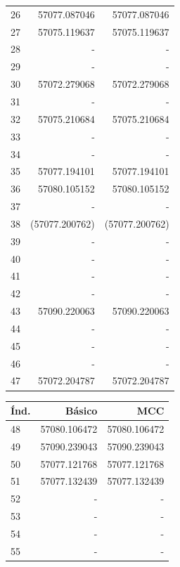 \begin{appendix}
\begin{table}[h!]
\begin{tabular}{|l|r|r|}
26& 57077.087046   & 57077.087046   \\
27& 57075.119637   & 57075.119637   \\
28& -              & -              \\
29& -              & -              \\
30& 57072.279068   & 57072.279068   \\
31& -              & -              \\
32& 57075.210684   & 57075.210684   \\
33& -              & -              \\
34& -              & -              \\
35& 57077.194101   & 57077.194101   \\
36& 57080.105152   & 57080.105152   \\
37& -              & -              \\
38& (57077.200762) & (57077.200762) \\
39& -              & -              \\
40& -              & -              \\
41& -              & -              \\
42& -              & -              \\
43& 57090.220063   & 57090.220063   \\
44& -              & -              \\
45& -              & -              \\
46& -              & -              \\
47& 57072.204787   & 57072.204787   \\\hline
\end{tabular}
\quad
\begin{tabular}{|l|r|r|}
\hline
\textbf{\'Ind.} & \textbf{B\'asico} & \textbf{MCC}\\\hline
48& 57080.106472   & 57080.106472   \\
49& 57090.239043   & 57090.239043   \\
50& 57077.121768   & 57077.121768   \\
51& 57077.132439   & 57077.132439   \\
52& -              & -              \\
53& -              & -              \\
54& -              & -              \\
55& -              & -              \\

\end{tabular}
\end{table}
\end{appendix}
